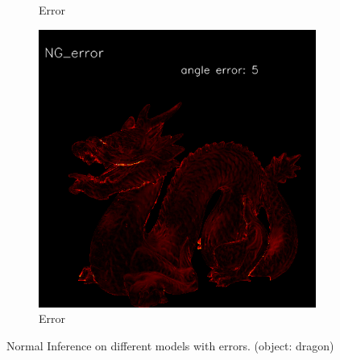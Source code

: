 \begin{figure}[h!]
\begin{subfigure}[b]{0.3\linewidth}
		\caption{Error}
	\end{subfigure}
	\begin{subfigure}[b]{0.3\linewidth}
		\includegraphics[width=\linewidth]{./Figures/comparison/fancy_eval_3_error_NG.png}
		\caption{Error}
	\end{subfigure}
	
	\caption{Normal Inference on different models with errors. (object: dragon)}
	\label{fig:eval-svd}
\end{figure}
